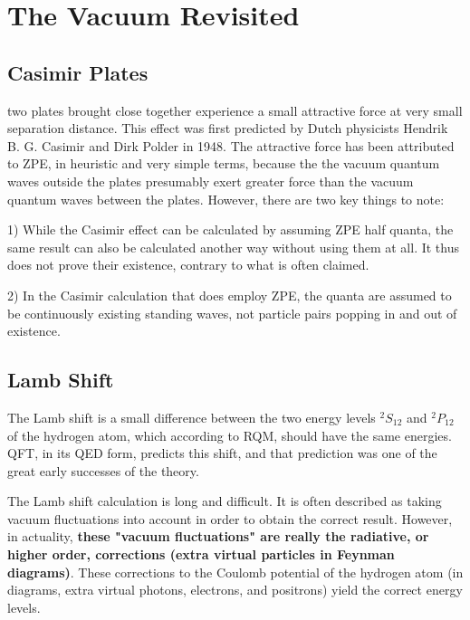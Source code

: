 \chapter{The Vacuum Revisited}
\section{Casimir Plates}
two plates brought close together experience a small attractive force at very small separation distance. This effect was first predicted by Dutch physicists Hendrik B. G. Casimir and Dirk Polder in 1948. The attractive force has been attributed to ZPE, in heuristic and very simple terms, because the the vacuum quantum waves outside the plates presumably exert greater force than the vacuum quantum waves between the plates. However, there are two key things to note:

1) While the Casimir effect can be calculated by assuming ZPE half quanta, the same result can also be calculated another way without using them at all. It thus does not prove their existence, contrary to what is often claimed.

2) In the Casimir calculation that does employ ZPE, the quanta are assumed to be continuously existing standing waves, not particle pairs popping in and out of existence.

\section{Lamb Shift}
The Lamb shift is a small difference between the two energy levels ${}^2 S_{12}$ and ${}^2 P_{12}$ of the hydrogen atom, which according to RQM, should have the same energies. QFT, in its QED form, predicts this shift, and that prediction was one of the great early successes of the theory.

The Lamb shift calculation is long and difficult. It is often described as taking vacuum fluctuations into account in order to obtain the correct result. However, in actuality, \textbf{these "vacuum fluctuations" are really the radiative, or higher order, corrections (extra virtual particles in Feynman diagrams)}. These corrections to the Coulomb potential of the hydrogen atom (in diagrams, extra virtual photons, electrons, and positrons) yield the correct energy levels.

